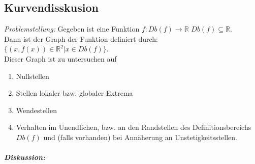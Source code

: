 \subsection{Kurvendisskusion}\label{3.3.3}
\emph{Problemstellung:} Gegeben ist eine Funktion $f: Db(f) \to \mathbb{R}$ $Db(f) \subseteq \mathbb{R}$.\\
Dann ist der Graph der Funktion definiert durch: $\{ (x,f(x))\in \mathbb{R}^2| x \in Db(f)\}$.\\
Dieser Graph ist zu untersuchen auf 
\begin{enumerate}[label=\alph*.)]
\item Nullstellen
\item Stellen lokaler bzw. globaler Extrema
\item Wendestellen
\item Verhalten im Unendlichen, bzw. an den Randstellen des Definitionsbereichs $Db(f)$ und (falls vorhanden) bei Annäherung an Unstetigkeitsstellen.
\end{enumerate}
\subparagraph{Diskussion:} 
